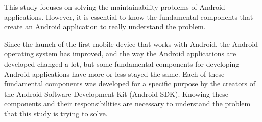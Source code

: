 This study focuses on solving the maintainability problems of Android applications. However, it is essential to know the fundamental components that create an Android application to really understand the problem.

Since the launch of the first mobile device that works with Android,  the Android operating system has improved, and the way the Android applications are developed changed a lot, but some fundamental components for developing Android applications have more or less stayed the same. Each of these fundamental components was developed for a specific purpose by the creators of the Android Software Development Kit (Android SDK). Knowing these components and their responsibilities are necessary to understand the problem that this study is trying to solve. %


